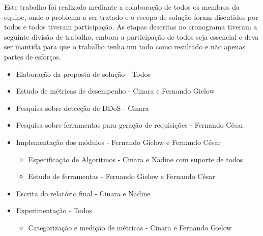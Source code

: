 
Este trabalho foi realizado mediante a colaboração de todos os membros da equipe, onde o problema a ser tratado e o escopo de solução foram discutidos por todos e todos tiveram participação. As etapas descritas no cronograma tiveram a seguinte divisão de trabalho, embora a participação de todos seja essencial e deva ser mantida para que o trabalho tenha um todo como resultado e não apenas partes de esforços.


\begin{itemize}
\item Elaboração da proposta de solução - Todos
\item Estudo de métricas de desempenho - Cinara e Fernando Gielow
\item Pesquisa sobre detecção de DDoS - Cinara
\item Pesquisa sobre ferramentas para geração de requisições - Fernando César
\item Implementação dos módulos - Fernando Gielow e Fernando César
\begin{itemize}
\item Especificação de Algoritmos - Cinara e Nadine com suporte de todos
\item Estudo de ferramentas - Fernando Gielow e Fernando César
\end{itemize}
\item Escrita do relatório final - Cinara e Nadine
\item Experimentação - Todos
\begin{itemize}
\item Categorização e medição de métricas - Cinara e Fernando Gielow
\end{itemize}

\end{itemize}



